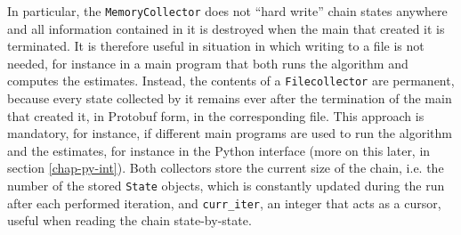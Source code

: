 In particular, the \verb|MemoryCollector| does not ``hard write'' chain states anywhere and all information contained in it is destroyed when the main that created it is terminated.
It is therefore useful in situation in which writing to a file is not needed, for instance in a main program that both runs the algorithm and computes the estimates.
Instead, the contents of a \verb|Filecollector| are permanent, because every state collected by it remains ever after the termination of the main that created it, in Protobuf form, in the corresponding file.
This approach is mandatory, for instance, if different main programs are used to run the algorithm and the estimates, for instance in the Python interface (more on this later, in section \ref{chap-py-int}).
Both collectors store the current size of the chain, i.e. the number of the stored \verb|State| objects, which is constantly updated during the run after each performed iteration, and \verb|curr_iter|, an integer that acts as a cursor, useful when reading the chain state-by-state.

